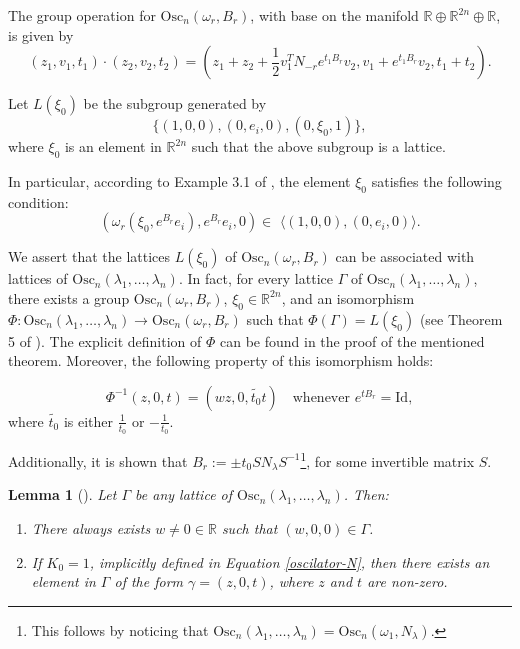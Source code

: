 \documentclass[12pt]{amsart}
\theoremstyle{plain}
\newtheorem{lem}[thm]{Lemma}
\theoremstyle{definition}
\theoremstyle{remark}
\begin{document}
The group operation for \( \text{Osc}_n(\omega_r, B_r) \), with base on the manifold \( \mathbb{R} \oplus \mathbb{R}^{2n} \oplus \mathbb{R} \), is given by
\begin{equation}
    (z_1, v_1, t_1) \cdot (z_2, v_2, t_2) = \left(z_1 + z_2 + \frac{1}{2} v_1^T N_{-r} e^{t_1 B_r} v_2, v_1 + e^{t_1 B_r} v_2, t_1 + t_2\right).
\end{equation}

Let \( L(\xi_0) \) be the subgroup generated by 
\[
\{ (1,0,0), (0,e_i,0), (0,\xi_0,1) \},
\]
where \( \xi_0 \) is an element in \( \mathbb{R}^{2n} \) such that the above subgroup is a lattice.

In particular, according to Example 3.1 of \cite{MF}, the element \( \xi_0 \) satisfies the following condition:
\begin{equation}\label{xi-condition}
    (\omega_r(\xi_0, e^{B_r}e_i), e^{B_r} e_i, 0) \in \,\, \langle (1,0,0), (0,e_i,0) \rangle.
\end{equation}

	
	

We assert that the lattices \( L(\xi_0) \) of \( \text{Osc}_n(\omega_r, B_r) \) can be associated with lattices of \( \text{Osc}_n(\lambda_1, \ldots, \lambda_n) \). In fact, for every lattice \( \Gamma \) of \( \text{Osc}_n(\lambda_1, \ldots, \lambda_n) \), there exists a group \( \text{Osc}_n(\omega_r, B_r) \), \( \xi_0 \in \mathbb{R}^{2n} \), and an isomorphism \( \Phi: \text{Osc}_n(\lambda_1, \ldots, \lambda_n) \rightarrow \text{Osc}_n(\omega_r, B_r) \) such that \( \Phi(\Gamma) = L(\xi_0) \) (see Theorem 5 of \cite{MF}). The explicit definition of \( \Phi \) can be found in the proof of the mentioned theorem. Moreover, the following property of this isomorphism holds:

\begin{equation} \label{condition-exp}
    \Phi^{-1}(z,0,t) = (w z, 0, \widetilde{t_0} t) \quad \text{whenever } e^{t B_r} = \text{Id},
\end{equation}
where \( \widetilde{t_0} \) is either \( \frac{1}{t_0} \) or \( -\frac{1}{t_0} \).

Additionally, it is shown that \( B_r := \pm t_0 S N_{\lambda} S^{-1} \)\footnote{This follows by noticing that \( \text{Osc}_n(\lambda_1, \ldots, \lambda_n) = \text{Osc}_n(\omega_1, N_{\lambda}) \).}, for some invertible matrix \( S \).

\begin{lem}[\cite{MF}]\label{oscilador-elementos}
    Let \( \Gamma \) be any lattice of \( \text{Osc}_n(\lambda_1, \ldots, \lambda_n) \). Then:
    \begin{enumerate}
        \item There always exists \( w \neq 0 \in \mathbb{R} \) such that \( (w, 0, 0) \in \Gamma \).
        \item If \( K_0 = 1 \), implicitly defined in Equation \eqref{oscilator-N}, then there exists an element in \( \Gamma \) of the form \( \gamma = (z, 0, t) \), where \( z \) and \( t \) are non-zero.
    \end{enumerate}
\end{lem}
\end{document}
